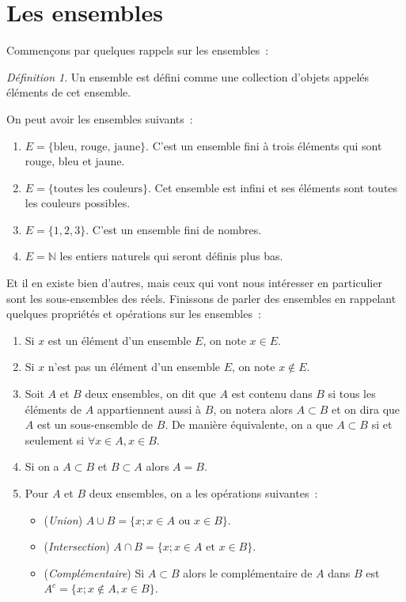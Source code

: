 \documentclass[oneside,12pt,french,table]{book}
\theoremstyle{definition}
\theoremstyle{plain}
\theoremstyle{remark}
\newtheorem{defi}[definition]{Définition}
\newcommand{\Nn}{{\mathbb{N}}}
\begin{document}
\section{Les ensembles}
Commençons par quelques rappels sur les ensembles :
\begin{defi}
  Un ensemble est défini comme une collection d'objets appelés éléments de cet ensemble.   
\end{defi}
On peut avoir les ensembles suivants : 
\begin{enumerate}
    \item $E=\{\text{bleu, rouge, jaune}\}$. C'est un ensemble fini à trois éléments qui sont rouge, bleu et jaune. 
    \item $E=\{\text{toutes les couleurs}\}$. Cet ensemble est infini et ses éléments sont toutes les couleurs possibles. 
    \item $E=\{1,2,3\}$. C'est un ensemble fini de nombres. 
    \item $E=\Nn$ les entiers naturels qui seront définis plus bas. 
\end{enumerate}
Et il en existe bien d'autres, mais ceux qui vont nous intéresser en particulier sont les sous-ensembles des réels. Finissons de parler des ensembles en rappelant quelques propriétés et opérations sur les ensembles : 
\begin{enumerate}
    \item Si $x$ est un élément d'un ensemble $E$, on note $x\in E$.
    \item Si $x$ n'est pas un élément d'un ensemble $E$, on note $x\notin E$.
    \item Soit $A$ et $B$ deux ensembles, on dit que $A$ est contenu dans $B$ si tous les éléments de $A$ appartiennent aussi à $B$, on notera alors $A\subset B$ et on dira que $A$ est un sous-ensemble de $B$. De manière équivalente, on a que $A\subset B$ si et seulement si $\forall x\in A, x\in B$.
    \item Si on a $A\subset B$ et $B\subset A$ alors $A=B$. 
    \item Pour $A$ et $B$ deux ensembles, on a les opérations suivantes :
    \begin{itemize}
        \item (\textit{Union}) $A\cup B=\{x; x\in A \text{ ou } x\in B\}$. 
        \item (\textit{Intersection}) $A\cap B=\{x; x\in A \text{ et } x\in B\}$. 
        \item (\textit{Complémentaire}) Si $A\subset B$ alors le complémentaire de $A$ dans $B$ est $A^c=\{x; x\notin A, x\in B\}$. 
    \end{itemize}
\end{enumerate}
\end{document}
